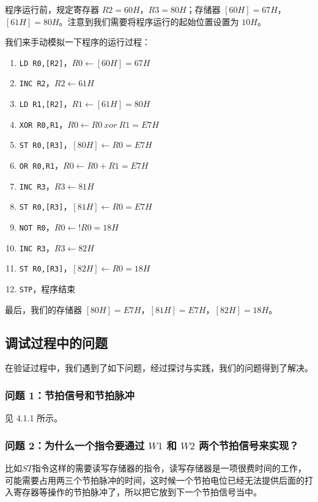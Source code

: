 \documentclass[12pt]{article}
\begin{document}
{        程序运行前，规定寄存器 $R2=60H$，$R3=80H$；存储器 $[60H]=67H$，$[61H]=80H$。注意到我们需要将程序运行的起始位置设置为 $10H$。
        
        我们来手动模拟一下程序的运行过程：
        
        \begin{enumerate}
            \item \verb"LD R0,[R2]"，$R0\gets [60H]=67H$
            \item \verb"INC R2"，$R2\gets 61H$
            \item \verb"LD R1,[R2]"，$R1\gets [61H]=80H$
            \item \verb"XOR R0,R1"，$R0\gets R0\ xor\ R1=E7H$
            \item \verb"ST R0,[R3]"，$[80H]\gets R0=E7H$
            \item \verb"OR R0,R1"，$R0\gets R0+R1=E7H$
            \item \verb"INC R3"，$R3\gets 81H$
            \item \verb"ST R0,[R3]"，$[81H]\gets R0=E7H$
            \item \verb"NOT R0"，$R0\gets !R0=18H$
            \item \verb"INC R3"，$R3\gets 82H$
            \item \verb"ST R0,[R3]"，$[82H]\gets R0=18H$
            \item \verb"STP"，程序结束
        \end{enumerate}
        
        最后，我们的存储器 $[80H]=E7H$，$[81H]=E7H$，$[82H]=18H$。
        
    \subsection{调试过程中的问题}
        在验证过程中，我们遇到了如下问题，经过探讨与实践，我们的问题得到了解决。
        
        \subsubsection{问题 1：节拍信号和节拍脉冲}
            见 4.1.1 所示。
        \subsubsection{问题 2：为什么一个指令要通过 $W1$ 和 $W2$ 两个节拍信号来实现？}
            比如$ST$指令这样的需要读写存储器的指令，读写存储器是一项很费时间的工作，可能需要占用两三个节拍脉冲的时间，这时候一个节拍电位已经无法提供后面的打入寄存器等操作的节拍脉冲了，所以把它放到下一个节拍信号当中。
            
}
\end{document}
